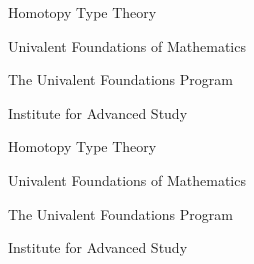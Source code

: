 %

\vspace*{0.05\textheight}
{\centering
{\fontsize{45}{60}\selectfont%
Homotopy Type Theory}\par
\vspace*{20pt}
{\fontsize{23}{40}\selectfont%
Univalent Foundations of Mathematics}\par
\vfill
{\fontsize{20}{25}\selectfont%
The Univalent Foundations Program\par
\vspace*{8pt}
Institute for Advanced Study\par
}}
\vspace*{0.05\textheight}
\cleardoublepage

\vspace*{0.2\textheight}
{\centering
{\fontsize{35}{40}\selectfont%
Homotopy Type Theory}\par
\vspace*{10pt}
{\fontsize{18}{20}\selectfont%
Univalent Foundations of Mathematics}\par
\vspace*{30pt}
{\fontsize{15}{20}\selectfont%
The Univalent Foundations Program\par
\vspace*{4pt}
Institute for Advanced Study\par
}}
\hbox{}

\clearpage
\restoregeometry

\hbox{}
\vfill

